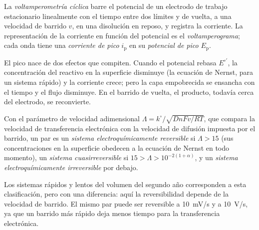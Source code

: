 \begin{definition}\label{def:b3:electrode-kinetics:cv}
La \emph{voltamperometría cíclica} barre el potencial de un
electrodo de trabajo estacionario linealmente con el tiempo entre dos límites y de vuelta, a
una velocidad de barrido $v$, en una disolución en reposo, y registra la corriente. La representación de la corriente
en función del potencial es el \emph{voltamperograma}; cada onda tiene una
\emph{corriente de pico} $i_{\mathrm p}$ en su \emph{potencial de pico}
$E_{\mathrm p}$.
\end{definition}

El pico nace de dos efectos que compiten. Cuando el potencial rebasa $E^{\circ\prime}$, la
concentración del reactivo en la superficie disminuye (la ecuación de Nernst, para un sistema
rápido) y la corriente crece; pero la capa empobrecida se ensancha con el tiempo y
el flujo disminuye. En el barrido de vuelta, el producto, todavía cerca del electrodo, se
reconvierte.

\begin{definition}[Reversibilidad]\label{def:b3:electrode-kinetics:reversibility}
Con el parámetro de velocidad adimensional $\Lambda = k^\circ/\sqrt{DnFv/RT}$, que compara la
velocidad de transferencia electrónica con la velocidad de difusión impuesta por el barrido, un
par es un \emph{sistema electroquímicamente reversible}
si $\Lambda > 15$ (sus concentraciones en la superficie obedecen a la ecuación de Nernst
en todo momento), un \emph{sistema cuasirreversible} si $15 >
\Lambda > 10^{-2(1 + \alpha)}$, y un \emph{sistema electroquímicamente irreversible}
por debajo.
\end{definition}

\begin{remark}
Los sistemas rápidos y lentos del volumen del segundo año corresponden a esta
clasificación, pero con una diferencia: aquí la reversibilidad depende de la velocidad de
barrido. El mismo par puede ser reversible a \qty{10}{mV/s} y  a
\qty{10}{V/s}, ya que un barrido más rápido deja menos tiempo para la transferencia electrónica.
\end{remark}

